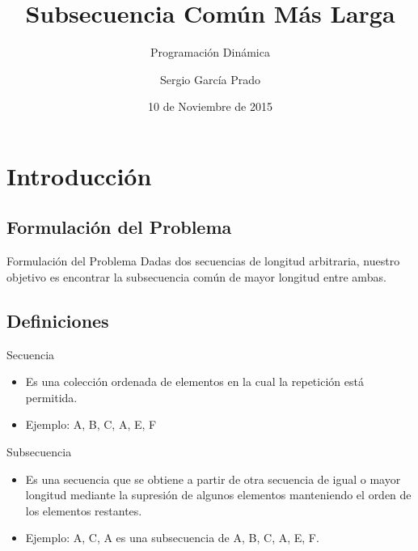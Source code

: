 \documentclass{beamer}
\title[Subsecuencia Común Más Larga]{Subsecuencia Común Más Larga}
\subtitle[Programación Dinámica]{Programación Dinámica}
\author{Sergio García Prado\\}
\date{10 de Noviembre de 2015}
\begin{document}

	\begin{frame}
		\titlepage
	\end{frame}

	
	\begin{frame}
		\tableofcontents
	\end{frame}


	\section{Introducción}

	
		\subsection{Formulación del Problema}
			\begin{frame}{Formulación del Problema}
 				Dadas dos secuencias de longitud arbitraria, nuestro objetivo es encontrar la subsecuencia común de mayor longitud entre ambas.

			\end{frame}
			
		\subsection{Definiciones}
		
		
			\begin{frame}{Secuencia}

 				\begin{itemize}
			
  					\item Es una colección ordenada de elementos en la cual la repetición está permitida.
  			
					\item Ejemplo: {A, B, C, A, E, F}

				\end{itemize}

			\end{frame}
			
			\begin{frame}{Subsecuencia}

 				\begin{itemize}
			
  					\item Es una secuencia que se obtiene a partir de otra secuencia de igual o mayor longitud mediante la supresión de algunos elementos manteniendo el orden de los elementos restantes.
  			
					\item Ejemplo: {A, C, A} es una subsecuencia de {A, B, C, A, E, F}.
  					

				\end{itemize}

			\end{frame}
\end{document}
